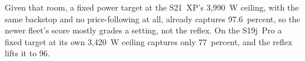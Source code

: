 Given that room, a fixed power target at the S21~XP's 3,990~W ceiling, with the same backstop and no price-following at all, already captures 97.6~percent, so the newer fleet's score mostly grades a setting, not the reflex. On the S19j~Pro a fixed target at its own 3,420~W ceiling captures only 77~percent, and the reflex lifts it to 96. %

